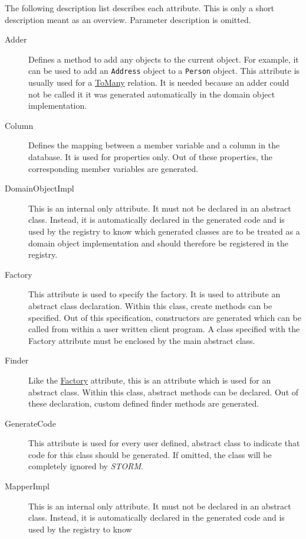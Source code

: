 		The following description list describes each attribute. This is only a short description
		meant as an overview.
		Parameter description is omitted.
		\begin{description}
			\item[Adder]
				Defines a method to add any objects to the current object. For example, it can be used
				to add an \verb~Address~ object to a \verb~Person~ object. This attribute is usually used
				for a \hyperlink{ToManyAttribute}{ToMany} relation. It is needed
				because an adder could not be called it it was generated automatically in the domain
				object implementation.
			\item[Column]
			\hypertarget{ColumnAttribute}{}
				Defines the mapping between a member variable and a column in the database. It is used for
				properties only. Out of these properties, the corresponding member variables are generated.
			\item[DomainObjectImpl]
			\hypertarget{DomainObjectImplAttribute}{}
				This is an internal only attribute. It must not be declared in an abstract class. Instead, it
				is automatically declared in the generated code and is used by the registry to know 
				which generated classes are to be treated as a domain object implementation and 
				should therefore be registered in the registry.
			\item[Factory]
			\hypertarget{FactoryAttribute}{}
				This attribute is used to specify the factory. It is used to attribute an abstract class declaration.
				Within this class, create methods can be specified. Out of this specification, constructors
				are generated which can be called from within a user written client program. A class specified with
				the Factory attribute must be enclosed by the main abstract class.
			\item[Finder]
			\hypertarget{FinderAttribute}{}
				Like the \hyperlink{FactoryAttribute}{Factory} attribute,
				this is an attribute which is used for an abstract class. Within this class, abstract methods
				can be declared. Out of these declaration, custom defined finder methods are generated.
			\item[GenerateCode]
				This attribute is used for every user defined, abstract class to indicate that
				code for this class should be generated. If omitted, the class will be completely
				ignored by \textit{STORM}.
			\item[MapperImpl]
				This is an internal only attribute. It must not be declared in an abstract class. Instead, it
				is automatically declared in the generated code and is used by the registry to know 

\end{description}
